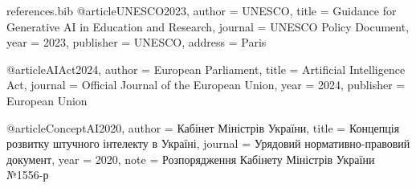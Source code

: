 \begin{filecontents}{references.bib}
@article{UNESCO2023,
  author  = {{UNESCO}},
  title   = {Guidance for Generative AI in Education and Research},
  journal = {UNESCO Policy Document},
  year    = {2023},
  publisher = {UNESCO},
  address = {Paris}
}

@article{AIAct2024,
  author  = {{European Parliament}},
  title   = {Artificial Intelligence Act},
  journal = {Official Journal of the European Union},
  year    = {2024},
  publisher = {European Union}
}

@article{ConceptAI2020,
  author  = {{Кабінет Міністрів України}},
  title   = {Концепція розвитку штучного інтелекту в Україні},
  journal = {Урядовий нормативно-правовий документ},
  year    = {2020},
  note    = {Розпорядження Кабінету Міністрів України №1556-р}
}

\end{filecontents}

\documentclass[14pt,a4paper]{extarticle}

\usepackage{polyglossia}
\setdefaultlanguage{ukrainian}

\usepackage{fontspec}
\setmainfont{DejaVu Serif}
\newfontfamily{}
\setmonofont{DejaVu Sans Mono}
\newfontfamily{}

\usepackage[a4paper,
left=30mm,
right=15mm,
top=20mm,
bottom=20mm]{geometry}

\usepackage{setspace}
\onehalfspacing

\usepackage{indentfirst}

\usepackage{float}
\usepackage{longtable}

\setlength{\parindent}{1.25cm}

\usepackage{hyperref}
\usepackage{csquotes}

\usepackage[
backend=biber,
style=authoryear, %
]{biblatex}



\usepackage{microtype}
\emergencystretch=3em




